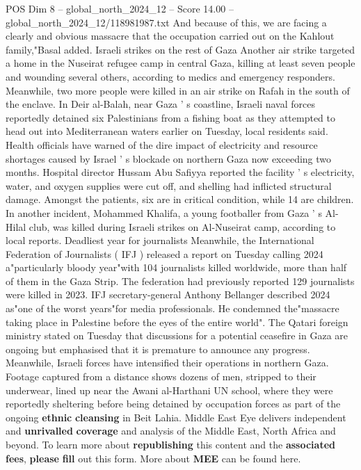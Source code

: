 \begin{textsample}{POS Dim 8 – global\_north\_2024\_12 – Score 14.00 – global\_north\_2024\_12/118981987.txt}
And because of this, we are facing a clearly and obvious massacre that the occupation carried out on the Kahlout family,"Basal added.
Israeli strikes on the rest of Gaza Another air strike targeted a home in the Nuseirat refugee camp in central Gaza, killing at least seven people and wounding several others, according to medics and emergency responders.
Meanwhile, two more people were killed in an air strike on Rafah in the south of the enclave.
In Deir al-Balah, near Gaza ' s coastline, Israeli naval forces reportedly detained six Palestinians from a fishing boat as they attempted to head out into Mediterranean waters earlier on Tuesday, local residents said.
Health officials have warned of the dire impact of electricity and resource shortages caused by Israel ' s blockade on northern Gaza now exceeding two months.
Hospital director Hussam Abu Safiyya reported the facility ' s electricity, water, and oxygen supplies were cut off, and shelling had inflicted structural damage.
Amongst the patients, six are in critical condition, while 14 are children.
In another incident, Mohammed Khalifa, a young footballer from Gaza ' s Al-Hilal club, was killed during Israeli strikes on Al-Nuseirat camp, according to local reports.
Deadliest year for journalists Meanwhile, the International Federation of Journalists ( IFJ ) released a report on Tuesday calling 2024 a"particularly bloody year"with 104 journalists killed worldwide, more than half of them in the Gaza Strip.
The federation had previously reported 129 journalists were killed in 2023.
IFJ secretary-general Anthony Bellanger described 2024 as"one of the worst years"for media professionals.
He condemned the"massacre taking place in Palestine before the eyes of the entire world".
The Qatari foreign ministry stated on Tuesday that discussions for a potential ceasefire in Gaza are ongoing but emphasised that it is premature to announce any progress.
Meanwhile, Israeli forces have intensified their operations in northern Gaza.
Footage captured from a distance shows dozens of men, stripped to their underwear, lined up near the Awani al-Harthani UN school, where they were reportedly sheltering before being detained by occupation forces as part of the ongoing \textbf{ethnic} \textbf{cleansing} in Beit Lahia.
Middle East Eye delivers independent and \textbf{unrivalled} \textbf{coverage} and analysis of the Middle East, North Africa and beyond.
To learn more about \textbf{republishing} this content and the \textbf{associated} \textbf{fees}, \textbf{please} \textbf{fill} out this form.
More about \textbf{MEE} can be found here.

\end{textsample}
